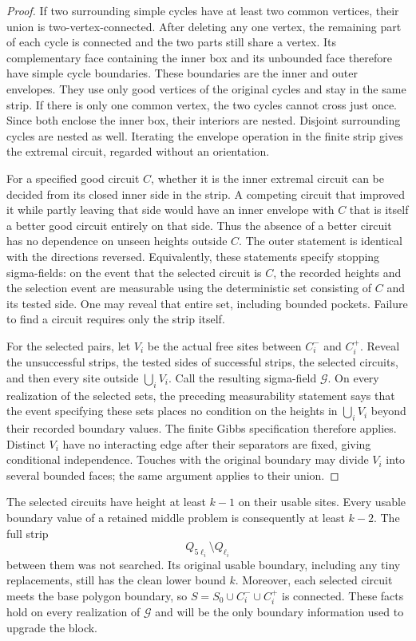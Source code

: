 \begin{proof}
If two surrounding simple cycles have at least two common vertices, their
union is two-vertex-connected.  After deleting any one vertex, the
remaining part of each cycle is connected and the two parts still share a
vertex.  Its complementary face containing the inner box and its unbounded
face therefore have simple cycle boundaries.  These boundaries are the
inner and outer envelopes.  They use only good vertices of the original
cycles and stay in the same strip.  If there is only one common vertex,
the two cycles cannot cross just once.  Since both enclose the inner box,
their interiors are nested.  Disjoint surrounding cycles are nested as
well.  Iterating the envelope operation in the finite strip gives the
extremal circuit, regarded without an orientation.

For a specified good circuit $C$, whether it is the inner extremal circuit
can be decided from its closed inner side in the strip.  A competing
circuit that improved it while partly leaving that side would have an
inner envelope with $C$ that is itself a better good circuit entirely on
that side.  Thus the absence of a better circuit has no dependence on
unseen heights outside $C$.  The outer statement is identical with the
directions reversed.  Equivalently, these statements specify stopping
sigma-fields: on the event that the selected circuit is $C$, the recorded
heights and the selection event are measurable using the deterministic set
consisting of $C$ and its tested side.  One may reveal that entire set,
including bounded pockets.  Failure to find a circuit requires only the
strip itself.

For the selected pairs, let $V_i$ be the actual free sites between $C_i^-$
and $C_i^+$.  Reveal the unsuccessful strips, the tested sides of successful
strips, the selected circuits, and then every site outside $\bigcup_i V_i$.
Call the resulting sigma-field $\mathcal G$.  On every realization of the
selected sets, the preceding measurability statement says that the event
specifying these sets places no condition on the heights in $\bigcup_i V_i$
beyond their recorded boundary values.  The finite Gibbs specification
therefore applies.  Distinct $V_i$ have no interacting edge after their
separators are fixed, giving conditional independence.  Touches with the
original boundary may divide $V_i$ into several bounded faces; the same
argument applies to their union.
\end{proof}

The selected circuits have height at least $k-1$ on their usable sites.
Every usable boundary value of a retained middle problem is consequently at
least $k-2$.  The full strip
\begin{equation}\label{eq:untouched-middle}
                     Q_{5\ell_i}\setminus Q_{\ell_i}
\end{equation}
between them was not searched.  Its original usable boundary, including any
tiny replacements, still has the clean lower bound $k$.  Moreover, each
selected circuit meets the base polygon boundary, so
$S=S_0\cup C_i^-\cup C_i^+$ is connected.  These facts hold on every
realization of $\mathcal G$ and will be the only boundary information used
to upgrade the block.

